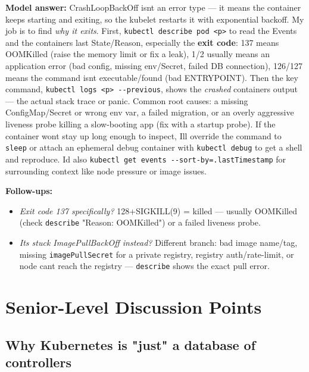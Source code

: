 \documentclass[11pt]{article}
\providecommand{\tightlist}{\setlength{\itemsep}{1pt}\setlength{\parskip}{0pt}}
\begin{document}
\textbf{Model answer:}
CrashLoopBackOff isn\textquotesingle t an error type --- it means the container keeps starting and exiting, so the kubelet restarts it with exponential backoff. My job is to find \emph{why it exits}. First, \texttt{kubectl\ describe\ pod\ \textless{}p\textgreater{}} to read the Events and the container\textquotesingle s last State/Reason, especially the \textbf{exit code}: 137 means OOMKilled (raise the memory limit or fix a leak), 1/2 usually means an application error (bad config, missing env/Secret, failed DB connection), 126/127 means the command isn\textquotesingle t executable/found (bad ENTRYPOINT). Then the key command, \texttt{kubectl\ logs\ \textless{}p\textgreater{}\ -\/-previous}, shows the \emph{crashed} container\textquotesingle s output --- the actual stack trace or panic. Common root causes: a missing ConfigMap/Secret or wrong env var, a failed migration, or an overly aggressive liveness probe killing a slow-booting app (fix with a startup probe). If the container won\textquotesingle t stay up long enough to inspect, I\textquotesingle ll override the command to \texttt{sleep} or attach an ephemeral debug container with \texttt{kubectl\ debug} to get a shell and reproduce. I\textquotesingle d also \texttt{kubectl\ get\ events\ -\/-sort-by=.lastTimestamp} for surrounding context like node pressure or image issues.

\textbf{Follow-ups:}

\begin{itemize}
\tightlist
\item
  \emph{Exit code 137 specifically?} 128+SIGKILL(9) = killed --- usually OOMKilled (check \texttt{describe} "Reason: OOMKilled") or a failed liveness probe.
\item
  \emph{It\textquotesingle s stuck ImagePullBackOff instead?} Different branch: bad image name/tag, missing \texttt{imagePullSecret} for a private registry, registry auth/rate-limit, or node can\textquotesingle t reach the registry --- \texttt{describe} shows the exact pull error.
\end{itemize}

\section{Senior-Level Discussion Points}\label{senior-level-discussion-points}

\subsection{Why Kubernetes is "just" a database of controllers}\label{why-kubernetes-is-just-a-database-of-controllers}
\end{document}
